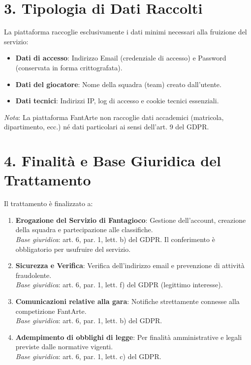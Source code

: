 \documentclass[a4paper,11pt]{article}
\begin{document}
\section*{3. Tipologia di Dati Raccolti}

La piattaforma raccoglie esclusivamente i dati minimi necessari alla fruizione del servizio:
\begin{itemize}[leftmargin=*]
    \item \textbf{Dati di accesso}: Indirizzo Email (credenziale di accesso) e Password (conservata in forma crittografata).
    \item \textbf{Dati del giocatore}: Nome della squadra (team) creato dall'utente.
    \item \textbf{Dati tecnici}: Indirizzi IP, log di accesso e cookie tecnici essenziali.
\end{itemize}

\textit{Nota}: La piattaforma FantArte non raccoglie dati accademici (matricola, dipartimento, ecc.) né dati particolari ai sensi dell'art. 9 del GDPR.

\section*{4. Finalità e Base Giuridica del Trattamento}

Il trattamento è finalizzato a:
\begin{enumerate}[leftmargin=*]
    \item \textbf{Erogazione del Servizio di Fantagioco}: Gestione dell'account, creazione della squadra e partecipazione alle classifiche.\\
    \textit{Base giuridica}: art. 6, par. 1, lett. b) del GDPR. Il conferimento è obbligatorio per usufruire del servizio.
    \item \textbf{Sicurezza e Verifica}: Verifica dell'indirizzo email e prevenzione di attività fraudolente.\\
    \textit{Base giuridica}: art. 6, par. 1, lett. f) del GDPR (legittimo interesse).
    \item \textbf{Comunicazioni relative alla gara}: Notifiche strettamente connesse alla competizione FantArte.\\
    \textit{Base giuridica}: art. 6, par. 1, lett. b) del GDPR.
    \item \textbf{Adempimento di obblighi di legge}: Per finalità amministrative e legali previste dalle normative vigenti.\\
    \textit{Base giuridica}: art. 6, par. 1, lett. c) del GDPR.
\end{enumerate}
\end{document}
